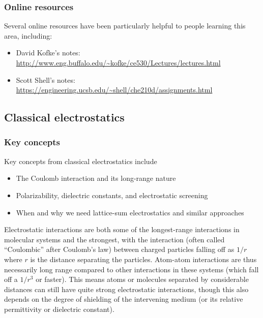 \documentclass[9pt,bestpractices]{livecoms}
\begin{document}
\subsubsection{Online resources}

Several online resources have been particularly helpful to people learning this area, including:
\begin{itemize}
\item David Kofke's notes: \url{http://www.eng.buffalo.edu/~kofke/ce530/Lectures/lectures.html}
\item Scott Shell's notes: \url{https://engineering.ucsb.edu/~shell/che210d/assignments.html}
\end{itemize}

\subsection{Classical electrostatics}
\label{sec:classical_electrostatics}
\subsubsection{Key concepts}
Key concepts from classical electrostatics include
\begin{itemize}
\item The Coulomb interaction and its long-range nature
\item Polarizability, dielectric constants, and electrostatic screening
\item When and why we need lattice-sum electrostatics and similar approaches
\end{itemize}


Electrostatic interactions are both some of the longest-range interactions in molecular systems and the strongest, with the interaction (often called
``Coulombic'' after Coulomb's law) between charged particles falling off as $1/r$ where $r$ is the distance separating the particles.
Atom-atom interactions are thus necessarily long range compared to other interactions in these systems (which fall off a $1/r^3$ or faster).
This means atoms or molecules separated by considerable distances can still have quite strong electrostatic interactions, though this also depends on the degree of shielding of the intervening medium (or its relative permittivity or dielectric constant).
\end{document}

